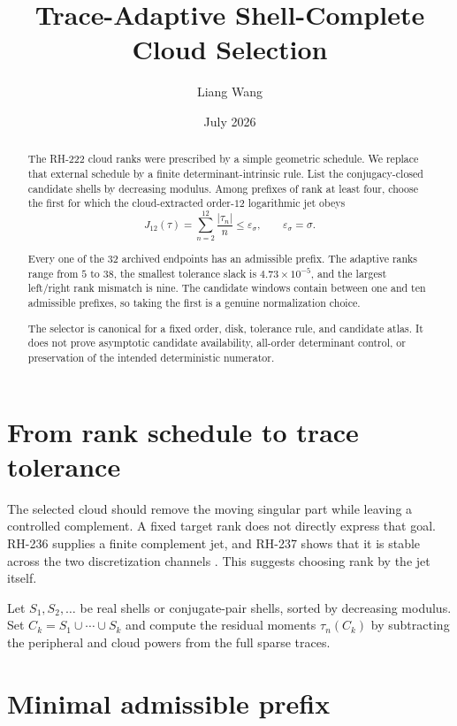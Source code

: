 \documentclass[11pt]{article}
\title{Trace-Adaptive Shell-Complete Cloud Selection}
\author{Liang Wang}
\date{July 2026}
\theoremstyle{remark}
\begin{document}
\maketitle

\begin{abstract}
The RH-222 cloud ranks were prescribed by a simple geometric schedule.  We
replace that external schedule by a finite determinant-intrinsic rule.  List
the conjugacy-closed candidate shells by decreasing modulus.  Among prefixes
of rank at least four, choose the first for which the cloud-extracted
order-$12$ logarithmic jet obeys
\[
 J_{12}(\tau)=\sum_{n=2}^{12}\frac{|\tau_n|}{n}
 \le\varepsilon_\sigma,
 \qquad \varepsilon_\sigma=\sigma.
\]

Every one of the 32 archived endpoints has an admissible prefix.  The
adaptive ranks range from $5$ to $38$, the smallest tolerance slack is
$4.73\times10^{-5}$, and the largest left/right rank mismatch is nine.  The
candidate windows contain between one and ten admissible prefixes, so taking
the first is a genuine normalization choice.

The selector is canonical for a fixed order, disk, tolerance rule, and
candidate atlas.  It does not prove asymptotic candidate availability,
all-order determinant control, or preservation of the intended deterministic
numerator.
\end{abstract}

\section{From rank schedule to trace tolerance}

The selected cloud should remove the moving singular part while leaving a
controlled complement.  A fixed target rank does not directly express that
goal.  RH-236 supplies a finite complement jet, and RH-237 shows that it is
stable across the two discretization channels \citep{WangRH236,WangRH237}.
This suggests choosing rank by the jet itself.

Let $S_1,S_2,\ldots$ be real shells or conjugate-pair shells, sorted by
decreasing modulus.  Set $C_k=S_1\cup\cdots\cup S_k$ and compute the residual
moments $\tau_n(C_k)$ by subtracting the peripheral and cloud powers from the
full sparse traces.

\section{Minimal admissible prefix}
\end{document}
